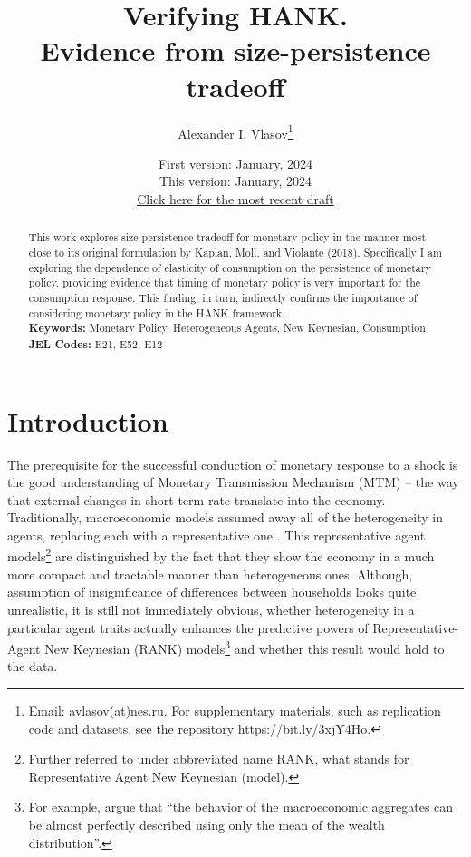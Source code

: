 \documentclass[12pt]{article}
\title{Verifying HANK.\\ Evidence from size-persistence tradeoff}
\author{Alexander I. Vlasov\thanks{Email: avlasov(at)nes.ru. For supplementary materials, such as replication code and datasets, see the repository \href{https://bit.ly/3xjY4Ho}{https://bit.ly/3xjY4Ho}.}}
\date{\normalsize First version: January, 2024\\\vspace{1ex} This version: January, 2024\\ \vspace{1ex}
\href{}{Click here for the most recent draft} }
\begin{document}
{}
\maketitle



\begin{abstract}
    \noindent This work explores size-persistence tradeoff for monetary policy in the manner most close to its original formulation by Kaplan, Moll, and Violante (2018). 
    Specifically I am exploring the dependence of elasticity of consumption on the persistence of monetary policy. providing evidence that timing of monetary policy is very important for the consumption response. This finding, in turn, indirectly confirms the importance of considering monetary policy in the HANK framework.
    \\
    \noindent\textbf{Keywords:} Monetary Policy, Heterogeneous Agents, New Keynesian, Consumption
    \\
    \noindent\textbf{JEL Codes:} E21, E52, E12 \\
    \bigskip
\end{abstract}

\section{Introduction}

The prerequisite for the successful conduction of monetary response to a shock is the good understanding of Monetary Transmission Mechanism (MTM) -- the way that external changes in short term rate translate into the economy. 
Traditionally, macroeconomic models assumed away all of the heterogeneity in agents, replacing each with a representative one \cite{Gali2018}.
This representative agent models\footnote{Further referred to under abbreviated name RANK, what stands for Representative Agent New Keynesian (model).} are distinguished by the fact that they show the economy in a much more compact and tractable manner than heterogeneous ones.
Although, assumption of insignificance of differences between households looks quite unrealistic, it is still not immediately obvious, whether heterogeneity in a particular agent traits actually enhances the predictive powers of Representative-Agent New Keynesian (RANK) models\footnote{For example, \citet{Krusell1998} argue that  ``the behavior of the macroeconomic aggregates can be almost perfectly described using only the mean of the wealth distribution''.} 
and whether this result would hold to the data.
\end{document}
